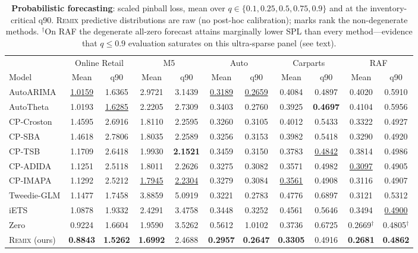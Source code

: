 \documentclass[twocolumn,10pt]{article}
\newcommand{\REMIX}{\textsc{Remix}}
\newcommand{\best}[1]{\textbf{#1}}
\newcommand{\secondbest}[1]{\underline{#1}}
\begin{document}
\begin{table}[t]
\centering
\caption{\textbf{Probabilistic forecasting}: scaled pinball loss, mean
over $q\in\{0.1,0.25,0.5,0.75,0.9\}$ and at the inventory-critical q90.
\REMIX{} predictive distributions are raw (no post-hoc calibration);
marks rank the non-degenerate methods.
$^{\dagger}$On RAF the degenerate all-zero forecast attains marginally
lower SPL than every method---evidence that $q\le0.9$ evaluation
saturates on this ultra-sparse panel (see text).}
\label{tab:prob}
\small
\setlength{\tabcolsep}{3.2pt}
\begin{tabular}{lcc@{\hspace{9pt}}cc@{\hspace{9pt}}cc@{\hspace{9pt}}cc@{\hspace{9pt}}cc}
\toprule
 & \multicolumn{2}{c}{Online Retail} & \multicolumn{2}{c}{M5} & \multicolumn{2}{c}{Auto} & \multicolumn{2}{c}{Carparts} & \multicolumn{2}{c}{RAF}\\
\cmidrule(lr){2-3}\cmidrule(lr){4-5}\cmidrule(lr){6-7}\cmidrule(lr){8-9}\cmidrule(lr){10-11}
Model & Mean & q90 & Mean & q90 & Mean & q90 & Mean & q90 & Mean & q90\\
\midrule
AutoARIMA & \secondbest{1.0159} & 1.6365 & 2.9721 & 3.1439 & \secondbest{0.3189} & \secondbest{0.2659} & 0.4084 & 0.4897 & 0.4020 & 0.5910\\
AutoTheta & 1.0193 & \secondbest{1.6285} & 2.2205 & 2.7309 & 0.3403 & 0.2760 & 0.3925 & \best{0.4697} & 0.4104 & 0.5956\\
CP-Croston & 1.4595 & 2.6916 & 1.8110 & 2.2595 & 0.3260 & 0.3105 & 0.4012 & 0.5433 & 0.3322 & 0.4927\\
CP-SBA & 1.4618 & 2.7806 & 1.8035 & 2.2589 & 0.3256 & 0.3153 & 0.3982 & 0.5418 & 0.3290 & 0.4920\\
CP-TSB & 1.1709 & 2.6418 & 1.9930 & \best{2.1521} & 0.3459 & 0.3150 & 0.3783 & \secondbest{0.4842} & 0.3814 & 0.4986\\
CP-ADIDA & 1.1251 & 2.5118 & 1.8011 & 2.2626 & 0.3275 & 0.3082 & 0.3571 & 0.4982 & \secondbest{0.3097} & 0.4905\\
CP-IMAPA & 1.1292 & 2.5212 & \secondbest{1.7945} & \secondbest{2.2304} & 0.3279 & 0.3084 & \secondbest{0.3561} & 0.4908 & 0.3116 & 0.4907\\
Tweedie-GLM & 1.1477 & 1.7458 & 3.8859 & 5.0919 & 0.3221 & 0.2783 & 0.4776 & 0.6897 & 0.3121 & 0.5312\\
iETS & 1.0878 & 1.9332 & 2.4291 & 3.4758 & 0.3448 & 0.3252 & 0.4561 & 0.5646 & 0.3494 & \secondbest{0.4900}\\
\midrule
Zero & 0.9224 & 1.6604 & 1.9590 & 3.5262 & 0.5612 & 1.0102 & 0.3736 & 0.6725 & 0.2669$^{\dagger}$ & 0.4805$^{\dagger}$\\
\midrule
\REMIX{} (ours) & \best{0.8843} & \best{1.5262} & \best{1.6992} & 2.4688 & \best{0.2957} & \best{0.2647} & \best{0.3305} & 0.4916 & \best{0.2681} & \best{0.4862}\\
\bottomrule
\end{tabular}
\end{table}
\end{document}
